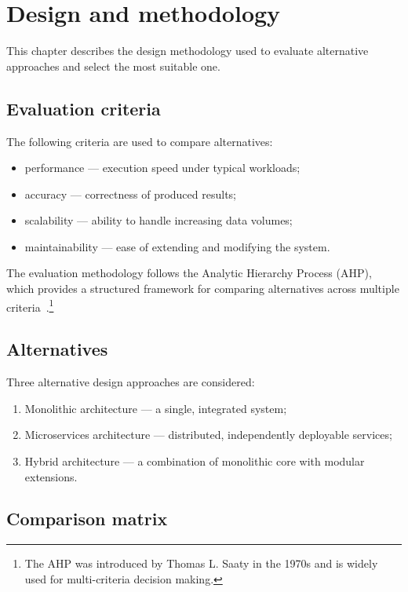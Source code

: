 \section{Design and methodology}\label{sec:design}

This chapter describes the design methodology used to evaluate alternative approaches and select the most suitable one.

\subsection{Evaluation criteria}

The following criteria are used to compare alternatives:
\begin{itemize}
  \item performance --- execution speed under typical workloads;
  \item accuracy --- correctness of produced results;
  \item scalability --- ability to handle increasing data volumes;
  \item maintainability --- ease of extending and modifying the system.
\end{itemize}

The evaluation methodology follows the Analytic Hierarchy Process (AHP), which provides a structured framework for comparing alternatives across multiple criteria~\cite{saaty2008decision}.\footnote{The AHP was introduced by Thomas L. Saaty in the 1970s and is widely used for multi-criteria decision making.}

\subsection{Alternatives}

Three alternative design approaches are considered:
\begin{enumerate}
  \item Monolithic architecture --- a single, integrated system;
  \item Microservices architecture --- distributed, independently deployable services;
  \item Hybrid architecture --- a combination of monolithic core with modular extensions.
\end{enumerate}

\subsection{Comparison matrix}

